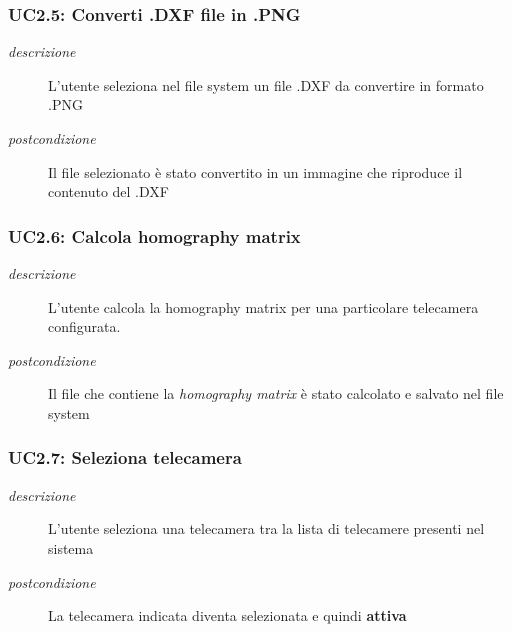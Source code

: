 \subsubsection{UC2.5: Converti .DXF file in .PNG} \label{sec:UC2.5}
\begin{description}
\item[\em{descrizione }]L'utente seleziona nel file system un file .DXF da convertire in formato .PNG 
\item[\em{postcondizione }] Il file selezionato è stato convertito in un immagine che riproduce il contenuto del .DXF
\end{description}

\subsubsection{UC2.6: Calcola homography matrix} \label{sec:UC2.6}
\begin{description}
\item[\em{descrizione }]L'utente calcola la homography matrix per una particolare telecamera configurata.
\item[\em{postcondizione }] Il file che contiene la \textit{homography matrix} è stato calcolato e salvato nel file system
\end{description}

\subsubsection{UC2.7: Seleziona telecamera} \label{sec:UC2.7}
\begin{description}
\item[\em{descrizione }]L'utente seleziona una telecamera tra la lista di telecamere presenti nel sistema
\item[\em{postcondizione }] La telecamera indicata diventa selezionata e quindi \textbf{attiva}
\end{description}


